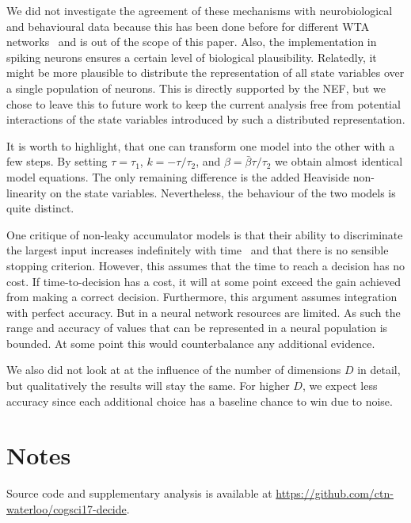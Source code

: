 \documentclass[10pt,letterpaper]{article}
\begin{document}

We did not investigate the agreement of these mechanisms with neurobiological and behavioural data because this has been done before for different WTA networks~\cite{gold2007,smith2004} and is out of the scope of this paper.
Also, the implementation in spiking neurons ensures a certain level of biological plausibility.
Relatedly, it might be more plausible to distribute the representation of all state variables over a single population of neurons.
This is directly supported by the NEF, but we chose to leave this to future work to keep the current analysis free from potential interactions of the state variables introduced by such a distributed representation.

It is worth to highlight, that one can transform one model into the other with a few steps.
By setting $\tau = \tau_1$, $k = -\tau/\tau_2$, and $\beta = \bar{\beta}\tau/\tau_2$ we obtain almost identical model equations.
The only remaining difference is the added Heaviside non-linearity on the state variables.
Nevertheless, the behaviour of the two models is quite distinct.

One critique of non-leaky accumulator models is that their ability to discriminate the largest input increases indefinitely with time~\cite{usher2001} and that there is no sensible stopping criterion.
However, this assumes that the time to reach a decision has no cost.
If time-to-decision has a cost, it will at some point exceed the gain achieved from making a correct decision.
Furthermore, this argument assumes integration with perfect accuracy.
But in a neural network resources are limited.
As such the range and accuracy of values that can be represented in a neural population is bounded.
At some point this would counterbalance any additional evidence.

We also did not look at at the influence of the number of dimensions $D$ in detail, but qualitatively the results will stay the same.
For higher $D$, we expect less accuracy since each additional choice has a baseline chance to win due to noise.

\section{Notes}
Source code and supplementary analysis is available at \url{https://github.com/ctn-waterloo/cogsci17-decide}.
\end{document}
